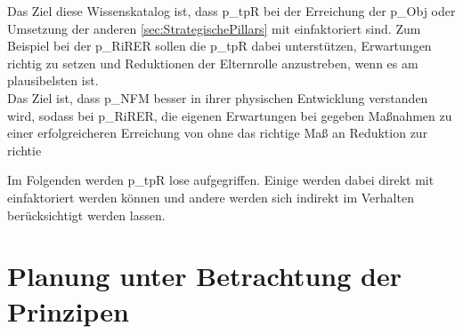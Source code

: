Das Ziel diese Wissenskatalog ist, dass \gls{p_tpR} bei der Erreichung der \gls{p_Obj} oder Umsetzung der anderen \ref{sec:StrategischePillars} mit einfaktoriert sind. Zum Beispiel bei der \gls{p_RiRER} sollen die \gls{p_tpR} dabei unterstützen, Erwartungen richtig zu setzen und Reduktionen der Elternrolle anzustreben, wenn es am plausibelsten ist.\\

Das Ziel ist, dass \gls{p_NFM} besser in ihrer physischen Entwicklung verstanden wird, sodass bei \gls{p_RiRER}, die eigenen Erwartungen 
bei gegeben Maßnahmen zu einer erfolgreicheren Erreichung von  ohne 
das richtige Maß an Reduktion zur richtie 


Im Folgenden werden \gls{p_tpR} lose aufgegriffen. Einige werden dabei direkt mit einfaktoriert werden können und andere werden sich indirekt im Verhalten berücksichtigt werden lassen.\\


\section{Planung unter Betrachtung der Prinzipen}